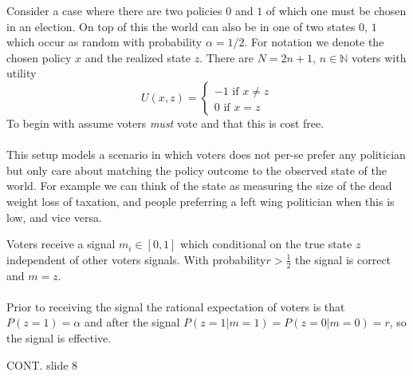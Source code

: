 Consider a case where there are two policies $0$ and $1$ of which one must be chosen in an election. On top of this the world can also be in one of two states $0$, $1$ which occur as random with probability $\alpha=1/2$. For notation we denote the chosen policy $x$ and the realized state $z$. There are $N=2n+1$, $n\in \mathbb{N}$ voters with utility 
\begin{equation}
    U(x,z) = \begin{cases}
        -1 \text{ if } x \neq z \\ 
        0  \text{ if } x = z 
    \end{cases}
\end{equation}  
To begin with assume voters \textit{must} vote and that this is cost free. 
\\ \\ 
This setup models a scenario in which voters does not per-se prefer any politician but only care about matching the policy outcome to the observed state of the world. For example we can think of the state as measuring the size of the dead weight loss of taxation, and people preferring a left wing politician when this is low, and vice versa. 

Voters receive a signal $m_i\in[0,1]$ which conditional on the true state $z$ independent of other voters signals. With probability$r>\frac{1}{2}$ the signal is correct and $m=z$. 
\\ \\
Prior to receiving the signal the rational expectation of voters is that $P(z=1)=\alpha$ and after the signal $P(z=1|m=1)=P(z=0|m=0)=r$, so the signal is effective. 

CONT. slide 8